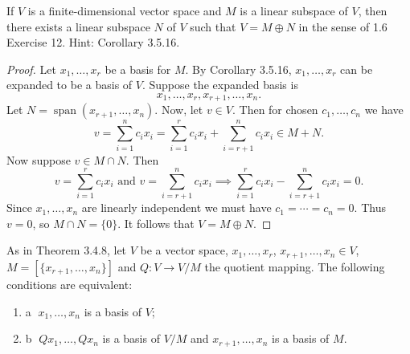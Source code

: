 \begin{tcolorbox}[title=Problem 24, breakable]
    If $V$ is a finite-dimensional vector space and $M$ 
    is a linear subspace of $V$, then there exists a linear subspace $N$ of $V$ 
    such that $V = M \oplus N$ in the sense of 1.6 Exercise 12. {Hint: Corollary 3.5.16.}
\end{tcolorbox}

\begin{proof}
    Let $x_1, \ldots, x_r$ be a basis for $M$.
    By Corollary 3.5.16, $x_1, \ldots, x_r$ can be expanded 
    to be a basis of $V$. Suppose the expanded basis is 
    \[x_1, \ldots, x_r, x_{r+1}, \ldots, x_n.\]
    Let $N = \operatorname{span}(x_{r+1}, \ldots, x_n)$.
    Now, let $v \in V$.
    Then for chosen $c_1, \ldots, c_n$ we have 
    \[v = \sum_{i=1}^{n} c_i x_i = \sum_{i=1}^{r} c_i x_i + \sum_{i=r+1}^{n} c_i x_i \in M + N.\]
    Now suppose $v \in M \cap N$.
    Then 
    \[v = \sum_{i=1}^{r} c_i x_i \text{ and } v = \sum_{i=r+1}^{n} c_i x_i \implies \sum_{i=1}^{r} c_i x_i - \sum_{i=r+1}^{n} c_i x_i = 0.\]
    Since $x_1, \ldots, x_n$ are linearly independent we must have $c_1 = \cdots = c_n = 0$.
    Thus $v = 0$, so $M \cap N = \{0\}$.
    It follows that $V = M \oplus N$.
\end{proof}


\begin{tcolorbox}[title=Problem 25, breakable]
    As in Theorem 3.4.8, let $V$ be a vector space,
    $x_1, \ldots, x_r$, $x_{r + 1}, \ldots, x_n \in V$,
    $M = [\{x_{r + 1}, \ldots, x_n\}]$ and $Q : V \longrightarrow V / M$
    the quotient mapping. The following conditions are equivalent:
    \begin{enumerate}
        \item \textcircled{a} $x_1, \ldots, x_n$ is a basis of $V$;
        \item \textcircled{b} $Q x_1, \ldots, Q x_n$ is a basis of $V / M$ and $x_{r + 1}, \ldots, x_n$ is a basis of $M$.
    \end{enumerate}
\end{tcolorbox}

